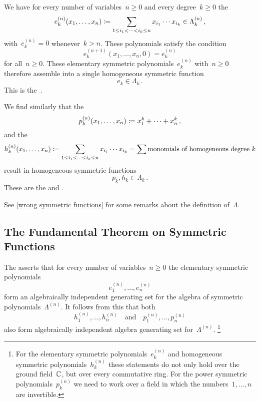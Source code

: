 \documentclass[a4paper,11pt]{scrartcl}
\begin{document}
\begin{example}
  We have for every number of variables~$n \geq 0$ and every degree~$k \geq 0$ the 
  \[
    e^{(n)}_k(x_1, \dotsc, x_n)
    \coloneqq
    \sum_{1 \leq i_1 < \dotsb < i_k \leq n}
    x_{i_1} \dotsm x_{i_k}
    \in
    \Lambda^{(n)}_k \,,
  \]
  with~$e^{(n)}_k = 0$ whenever~$k > n$.
  These polynomials satisfy the condition
  \[
    e^{(n+1)}_k(x_1, \dotsc, x_n, 0)
    =
    e^{(n)}_k
  \]
  for all~$n \geq 0$.
  These elementary symmetric polynomials~$e^{(n)}_k$ with~$n \geq 0$ therefore assemble into a single homogeneous symmetric function
  \[
    e_k \in \Lambda_k \,.
  \]
  This is the~. 

  We find similarly that the 
  \[
    p^{(n)}_k(x_1, \dotsc, x_n)
    \coloneqq
    x_1^k + \dotsb + x_n^k \,,
  \]
  and the 
  \[
    h^{(n)}_k(x_1, \dotsc, x_n)
    \coloneqq
    \sum_{1 \leq i_1 \leq \dotsb \leq i_k \leq n}
    x_{i_1} \dotsm x_{i_k}
    =
    \sum \text{monomials of homogeneous degree~$k$}
  \]
  result in homogeneous symmetric functions
  \[
    p_k, h_k
    \in
    \Lambda_k \,.
  \]
  These are the  and .
\end{example}

See \cref{wrong symmetric functions} for some remarks about the definition of~$\Lambda$.



\subsection{The Fundamental Theorem on Symmetric Functions}

The  asserts that for every number of variables~$n \geq 0$ the elementary symmetric polynomials
\[
  e^{(n)}_1, \dotsc, e^{(n)}_n
\]
form an algebraically independent generating set for the algebra of symmetric polynomials~$\Lambda^{(n)}$.
It follows from this that both
\[
  h^{(n)}_1, \dotsc, h^{(n)}_n
  \quad\text{and}\quad
  p^{(n)}_1, \dotsc, p^{(n)}_n
\]
also form algebraically independent algebra generating set for~$\Lambda^{(n)}$.%
\footnote{
  For the elementary symmetric polynomials~$e^{(n)}_k$ and homogeneous symmetric polynomials~$h^{(n)}_k$ these statements do not only hold over the ground field~$\mathbb{C}$, but over every commutative ring.
  For the power symmetric polynomials~$p^{(n)}_k$ we need to work over a field in which the numbers~$1, \dotsc, n$ are invertible.
}
\end{document}
